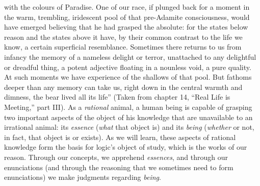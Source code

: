 \documentclass[article,12pt,a4paper,oneside]{memoir}
\begin{document}
{      with the colours of Paradise. One of our race, if plunged back for
      a moment in the warm, trembling, iridescent pool of that
      pre-Adamite consciousness, would have emerged believing that he
      had grasped the absolute: for the states below reason and the
      states above it have, by their common contrast to the life we
      know, a certain superficial resemblance. Sometimes there returns
      to us from infancy the memory of a nameless delight or terror,
      unattached to any delightful or dreadful thing, a potent adjective
      floating in a nounless void, a pure quality. At such moments we
      have experience of the shallows of that pool. But fathoms deeper
      than any memory can take us, right down in the central warmth and
      dimness, the bear lived all its life'' (Taken from chapter 14,
      ``Real Life is Meeting,'' part III).} As a \emph{rational} animal,
    a human being is capable of grasping two important aspects of the
    object of his knowledge that are unavailable to an irrational
    animal: its \emph{essence} (\emph{what} that object is) and its
    \emph{being} (\emph{whether} or not, in fact, that object is or
    exists). As we will learn, these aspects of rational knowledge form
    the basis for logic's object of study, which is the works of our
    reason. Through our concepts, we apprehend \emph{essences}, and
    through our enunciations (and through the reasoning that we
    sometimes need to form enunciations) we make judgments regarding
    \emph{being}.
\end{document}
